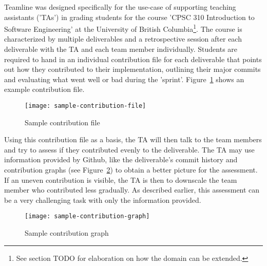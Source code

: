 \documentclass[../manifest.tex]{subfiles}
\begin{document}
Teamline was designed specifically for the use-case of supporting teaching assistants ('TAs') in grading students for the course 'CPSC 310 Introduction to Software Engineering' at the University of British Columbia\footnote{See section TODO for elaboration on how the domain can be extended.}. The course is characterized by multiple deliverables and a retrospective session after each deliverable with the TA and each team member individually. Students are required to hand in an individual contribution file for each deliverable that points out how they contributed to their implementation, outlining their major commits and evaluating what went well or bad during the 'sprint'. Figure~\ref{fig:sample-contribution-file} shows an example contribution file.

\begin{figure}[h]
  \centering
  \texttt{[image: sample-contribution-file]}
  \caption{Sample contribution file}
  \label{fig:sample-contribution-file}
\end{figure}

Using this contribution file as a basis, the TA will then talk to the team members and try to assess if they contributed evenly to the deliverable. The TA may use information provided by Github, like the deliverable's commit history and contribution graphs (see Figure~\ref{fig:sample-contribution-graph}) to obtain a better picture for the assessment. If an uneven contribution is visible, the TA is then to downscale the team member who contributed less gradually. As described earlier, this assessment can be a very challenging task with only the information provided.

\begin{figure}[h]
  \centering
  \texttt{[image: sample-contribution-graph]}
  \caption{Sample contribution graph}
  \label{fig:sample-contribution-graph}
\end{figure}
\end{document}
